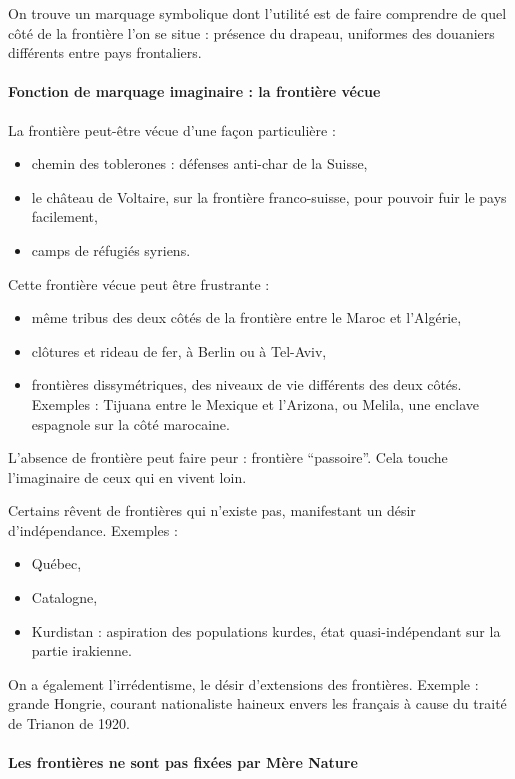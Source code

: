 \documentclass[a4paper,10pt]{article}
\begin{document}
		On trouve un marquage symbolique dont l'utilité est de faire comprendre de quel côté de la frontière l'on se situe : présence du drapeau, uniformes des douaniers différents entre pays frontaliers.

		\paragraph{Fonction de marquage imaginaire : la frontière vécue}

		La frontière peut-être vécue d'une façon particulière :
		\begin{itemize}
		\item chemin des toblerones : défenses anti-char de la Suisse,
		\item le château de Voltaire, sur la frontière franco-suisse, pour pouvoir fuir le pays facilement,
		\item camps de réfugiés syriens.
		\end{itemize}

		Cette frontière vécue peut être frustrante :
		\begin{itemize}
		\item même tribus des deux côtés de la frontière entre le Maroc et l'Algérie,
		\item clôtures et rideau de fer, à Berlin ou à Tel-Aviv,
		\item frontières dissymétriques, des niveaux de vie différents des deux côtés. Exemples : Tijuana entre le Mexique et l'Arizona, ou Melila, une enclave espagnole sur la côté marocaine.
		\end{itemize}

		L'absence de frontière peut faire peur : frontière “passoire”.
		Cela touche l'imaginaire de ceux qui en vivent loin.

		Certains rêvent de frontières qui n'existe pas, manifestant un désir d'indépendance.
		Exemples :
		\begin{itemize}
		\item Québec,
		\item Catalogne,
		\item Kurdistan : aspiration des populations kurdes, état quasi-indépendant sur la partie irakienne.
		\end{itemize}

		On a également l'irrédentisme, le désir d'extensions des frontières.
		Exemple : grande Hongrie, courant nationaliste haineux envers les français à cause du traité de Trianon de 1920.

		\paragraph{Les frontières ne sont pas fixées par Mère Nature}
\end{document}

